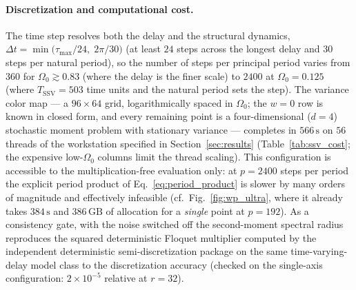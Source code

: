 \documentclass[preprint,12pt]{elsarticle}
\begin{document}
\paragraph{Discretization and computational cost.}
The time step resolves both the delay and the structural dynamics, $\Delta t = \min\!\big(\tau_{\max}/24,\; 2\pi/30\big)$ (at least $24$ steps across the longest delay and $30$ steps per natural period), so the number of steps per principal period varies from $360$ for $\Omega_0 \gtrsim 0.83$ (where the delay is the finer scale) to $2400$ at $\Omega_0 = 0.125$ (where $T_{\mathrm{SSV}} = 503$ time units and the natural period sets the step). The variance color map --- a $96\times64$ grid, logarithmically spaced in $\Omega_0$; the $w=0$ row is known in closed form, and every remaining point is a four-dimensional ($d=4$) stochastic moment problem with stationary variance --- completes in $566\,\mathrm{s}$ on $56$ threads of the workstation specified in Section~\ref{sec:results} (Table~\ref{tab:ssv_cost}; the expensive low-$\Omega_0$ columns limit the thread scaling). This configuration is accessible to the multiplication-free evaluation only: at $p = 2400$ steps per period the explicit period product of Eq.~\eqref{eq:period_product} is slower by many orders of magnitude and effectively infeasible (cf.\ Fig.~\ref{fig:wp_ultra}, where it already takes $384\,\mathrm{s}$ and $386\,\mathrm{GB}$ of allocation for a \emph{single} point at $p=192$). As a consistency gate, with the noise switched off the second-moment spectral radius reproduces the squared deterministic Floquet multiplier computed by the independent deterministic semi-discretization package on the same time-varying-delay model class to the discretization accuracy (checked on the single-axis configuration: $2\times10^{-5}$ relative at $r=32$).
\end{document}
